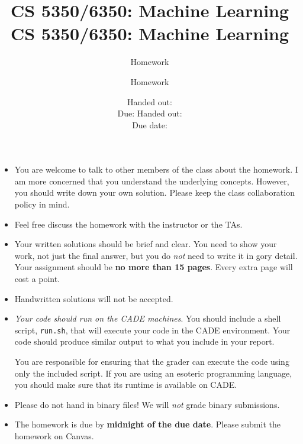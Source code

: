 \documentclass[12pt, fullpage,letterpaper]{article}
\title{CS 5350/6350: Machine Learning \semester}
\author{Homework \assignmentId}
\date{Handed out: \releaseDate\\
	Due: \dueDate}
\title{CS 5350/6350: Machine Learning \semester}
\author{Homework \assignmentId}
\date{Handed out: \releaseDate\\
  Due date: \dueDate}
\begin{document}
\maketitle


{\footnotesize
	\begin{itemize}
		\item You are welcome to talk to other members of the class about
		the homework. I am more concerned that you understand the
		underlying concepts. However, you should write down your own
		solution. Please keep the class collaboration policy in mind.
		
		\item Feel free discuss the homework with the instructor or the TAs.
		
		\item Your written solutions should be brief and clear. You need to
		show your work, not just the final answer, but you do \emph{not}
		need to write it in gory detail. Your assignment should be {\bf no
			more than 15 pages}. Every extra page will cost a point.
		
		\item Handwritten solutions will not be accepted.
		
		
		\item {\em Your code should run on the CADE machines}. You should
		include a shell script, {\tt run.sh}, that will execute your code
		in the CADE environment. Your code should produce similar output
		to what you include in your report.
		
		You are responsible for ensuring that the grader can execute the
		code using only the included script. If you are using an
		esoteric programming language, you should make sure that its
		runtime is available on CADE.
		
		\item Please do not hand in binary files! We will {\em not} grade
		binary submissions.
		
		\item The homework is due by \textbf{midnight of the due date}. Please submit
		the homework on Canvas.
		
	\end{itemize}
}
\end{document}
